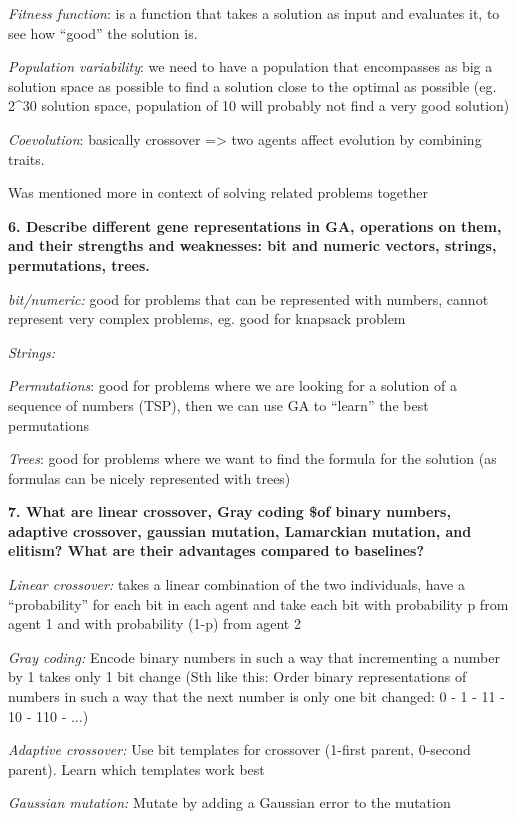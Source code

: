 \textit{Fitness function}: is a function that takes a solution as
input and evaluates it, to see how ``good'' the solution is.

\textit{Population variability}: we need to have a population that
encompasses as big a solution space as possible to find a solution close
to the optimal as possible (eg. 2\^{}30 solution space, population of 10
will probably not find a very good solution)

\textit{Coevolution}: basically crossover =\textgreater{} two agents
affect evolution by combining traits.

Was mentioned more in context of solving related problems together

\textbf{6. Describe different gene representations in GA, operations on
them, and their strengths and weaknesses: bit and numeric vectors,
strings, permutations, trees.}

\textit{bit/numeric:} good for problems that can be represented with
numbers, cannot represent very complex problems, eg. good for knapsack
problem

\textit{Strings:}

\textit{Permutations}: good for problems where we are looking for a
solution of a sequence of numbers (TSP), then we can use GA to ``learn''
the best permutations

\textit{Trees}: good for problems where we want to find the formula
for the solution (as formulas can be nicely represented with trees)

\textbf{7. What are linear crossover, Gray coding \$of binary numbers,
adaptive crossover, gaussian mutation, Lamarckian mutation, and elitism?
What are their advantages compared to baselines?}

\textit{Linear crossover:} takes a linear combination of the two
individuals, have a ``probability'' for each bit in each agent and take
each bit with probability p from agent 1 and with probability (1-p) from
agent 2

\textit{Gray coding:} Encode binary numbers in such a way that
incrementing a number by 1 takes only 1 bit change (Sth like this: Order
binary representations of numbers in such a way that the next number is
only one bit changed: 0 - 1 - 11 - 10 - 110 - ...)

\textit{Adaptive crossover:} Use bit templates for crossover (1-first
parent, 0-second parent). Learn which templates work best

\textit{Gaussian mutation:} Mutate by adding a Gaussian error to the
mutation

